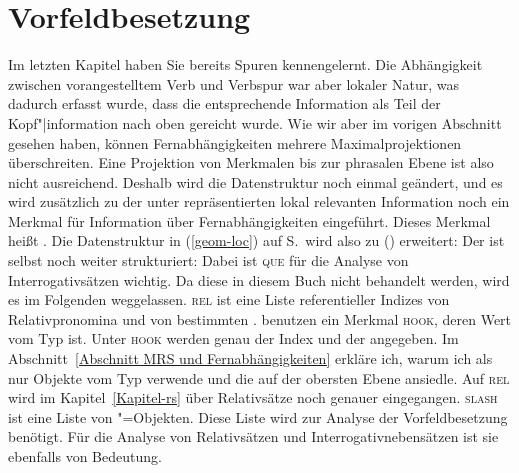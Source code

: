 \section{Vorfeldbesetzung}
\label{sec-Vorfeldbesetzung}

Im letzten Kapitel haben Sie bereits Spuren kennengelernt. Die Abhängigkeit zwischen vorangestelltem
Verb und Verbspur war aber lokaler Natur, was dadurch erfasst wurde, dass die entsprechende Information
als Teil der Kopf"|information nach oben gereicht wurde. Wie wir aber im vorigen Abschnitt gesehen haben,
können Fernabhängigkeiten mehrere Maximalprojektionen überschreiten. Eine Projektion von Merkmalen
bis zur phrasalen Ebene ist also nicht ausreichend. Deshalb wird die Datenstruktur noch einmal geändert,
und es wird zusätzlich zu der unter \local repräsentierten lokal relevanten Information noch ein
Merkmal für Information über Fernabhängigkeiten eingeführt. Dieses Merkmal heißt \nonloc.
Die Datenstruktur in (\ref{geom-loc}) auf S.\,\pageref{geom-loc} wird also zu () erweitert:
\ea
\label{geom-nonloc}
\z
Der \nonlocw ist selbst noch weiter strukturiert:
\ea
{}
\z
Dabei ist \textsc{que} für die Analyse von Interrogativsätzen wichtig. Da diese in diesem Buch nicht behandelt
werden, wird es im Folgenden weggelassen. \textsc{rel} ist eine Liste referentieller Indizes von
Relativpronomina und von bestimmten \ltopwen. \citet[305]{CFPS2005a} benutzen ein Merkmal \textsc{hook},
deren Wert vom Typ  ist. Unter \textsc{hook} werden genau der Index und der \ltopw
angegeben. Im Abschnitt~\ref{Abschnitt MRS und Fernabhängigkeiten} erkläre ich, warum ich als \contw nur Objekte vom Typ 
verwende und die \relslen auf der obersten Ebene ansiedle.
Auf \textsc{rel} wird im Kapitel~\ref{Kapitel-rs} über
Relativsätze noch genauer eingegangen. \textsc{slash} ist eine Liste von
"=Objekten. Diese Liste wird zur Analyse der Vorfeldbesetzung benötigt. Für die Analyse
von Relativsätzen und Interrogativnebensätzen ist sie ebenfalls von Bedeutung.



